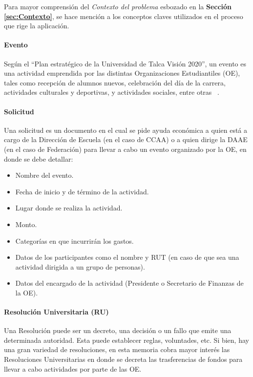 Para mayor comprensión del \emph{Contexto del problema} esbozado en la \textbf{Sección \ref{sec:Contexto}}, se hace mención a los conceptos claves utilizados en el proceso que rige la aplicación.

\paragraph{Evento}

  Según el ``Plan estratégico de la Universidad de Talca Visión 2020'', un evento es una actividad emprendida por las distintas Organizaciones Estudiantiles (OE), tales como recepción de alumnos nuevos, celebración del día de la carrera, actividades culturales y deportivas, y actividades sociales, entre otras ~\cite{5}. 

\paragraph{Solicitud}

  Una solicitud es un documento en el cual se pide ayuda económica a quien está a cargo de la Dirección de Escuela (en el caso de CCAA) o a quien dirige la DAAE (en el caso de Federación) para llevar a cabo un evento organizado por la OE, en donde se debe detallar:

  \begin{itemize}
      \item Nombre del evento.
      \item Fecha de inicio y de término de la actividad.
      \item Lugar donde se realiza la actividad. 
      \item Monto. 
      \item Categorías en que incurrirán los gastos.
      \item Datos de los participantes como el nombre y RUT (en caso de que sea una actividad dirigida a un grupo de personas). 
      \item Datos del encargado de la actividad (Presidente o Secretario de Finanzas de la OE).
  \end{itemize}

\paragraph{Resolución Universitaria (RU)}

  Una Resolución puede ser un decreto, una decisión o un fallo que emite una determinada autoridad. Esta puede establecer reglas, voluntades, etc. Si bien, hay una gran variedad de resoluciones, en esta memoria cobra mayor interés las Resoluciones Universitarias en donde se decreta las trasferencias de fondos para llevar a cabo actividades por parte de las OE.

